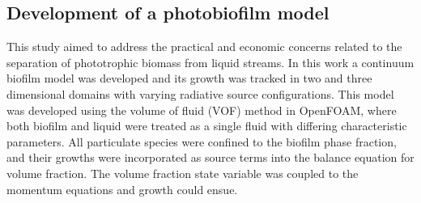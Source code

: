 \subsection{Development of a photobiofilm model}
This study aimed to address the practical and economic concerns related to the separation of phototrophic biomass from liquid streams. In this work a continuum biofilm model was developed and its growth was tracked in two and three dimensional domains with varying radiative source configurations. 
\skippingparagraph
This model was developed using the volume of fluid (VOF) method in OpenFOAM, where both biofilm and liquid were treated as a single fluid with differing characteristic parameters. All particulate species were confined to the biofilm phase fraction, and their growths were incorporated as source terms into the balance equation for volume fraction. The volume fraction state variable was coupled to the momentum equations and growth could ensue.



